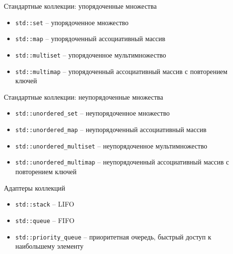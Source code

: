 \documentclass[unknownkeysallowed,xcolor=table]{beamer}
\begin{document}
\begin{frame}[fragile]{Стандартные коллекции: упорядоченные множества}

\begin{itemize}
  \item \lstinline{std::set} -- упорядоченное множество \vspace{0.7em}
  \item \lstinline{std::map} -- упорядоченный ассоциативный массив \vspace{0.7em}
  \item \lstinline{std::multiset} -- упорядоченное мультимножество \vspace{0.7em}
  \item \lstinline{std::multimap} -- упорядоченный ассоциативный массив с повторением ключей
\end{itemize}

\end{frame}

\begin{frame}[fragile]{Стандартные коллекции: неупорядоченные множества}

\begin{itemize}
  \item \lstinline{std::unordered_set} -- неупорядоченное множество \vspace{0.7em}
  \item \lstinline{std::unordered_map} -- неупорядоченный ассоциативный массив \vspace{0.7em}
  \item \lstinline{std::unordered_multiset} -- неупорядоченное мультимножество \vspace{0.7em}
  \item \lstinline{std::unordered_multimap} -- неупорядоченный ассоциативный массив с повторением ключей
\end{itemize}

\end{frame}

\begin{frame}[fragile]{Адаптеры коллекций}

\begin{itemize}
  \item \lstinline{std::stack} -- LIFO \vspace{0.7em}
  \item \lstinline{std::queue} -- FIFO \vspace{0.7em}
  \item \lstinline{std::priority_queue} -- приоритетная очередь, быстрый доступ к наибольшему элементу
\end{itemize}

\end{frame}
\end{document}

